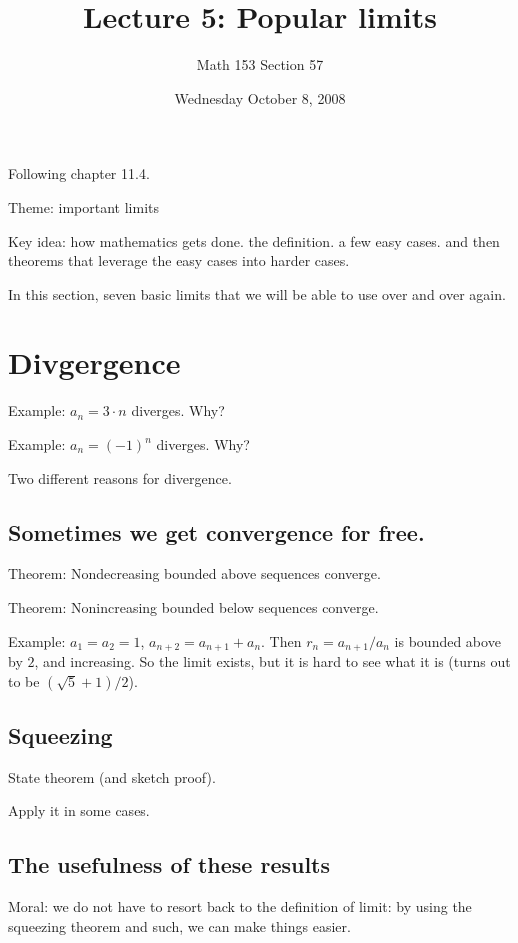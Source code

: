 \documentclass[12pt]{article}
\title{Lecture 5: Popular limits}
\author{Math 153 Section 57}
\date{Wednesday October  8, 2008}
\begin{document}
\maketitle

Following chapter 11.4.

Theme: important limits

Key idea: how mathematics gets done.  the definition.  a few easy cases.  and then theorems that leverage the easy cases into harder cases.

In this section, seven basic limits that we will be able to use over
and over again.

\section{Divgergence}

Example: $a_n = 3\cdot n$ diverges.  Why?

Example: $a_n = (-1)^n$ diverges.  Why?

Two different reasons for divergence.

\subsection{Sometimes we get convergence for free.}

Theorem: Nondecreasing bounded above sequences converge.

Theorem: Nonincreasing bounded below sequences converge.

Example: $a_1 = a_2 = 1$, $a_{n+2} = a_{n+1} + a_n$.  Then $r_n =
a_{n+1} / a_n$ is bounded above by $2$, and increasing.  So the limit
exists, but it is hard to see what it is (turns out to be $(\sqrt{5} +
1)/2$).

\subsection{Squeezing}

State theorem (and sketch proof).

Apply it in some cases.

\subsection{The usefulness of these results}

Moral: we do not have to resort back to the definition of limit: by
using the squeezing theorem and such, we can make things easier.
\end{document}
